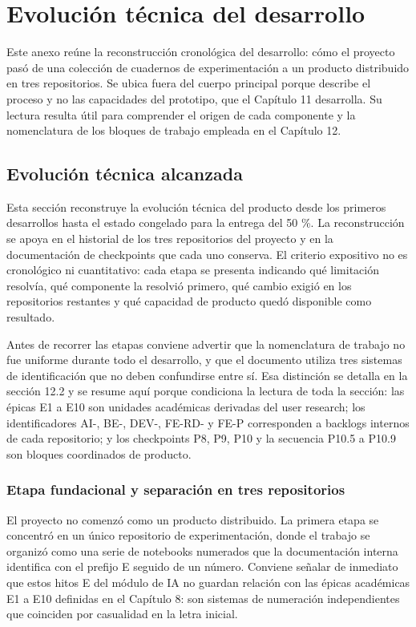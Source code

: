 \chapter{Evolución técnica del desarrollo}
\label{anexo:evolucion-tecnica}

Este anexo reúne la reconstrucción cronológica del desarrollo: cómo el proyecto pasó de una colección de cuadernos de experimentación a un producto distribuido en tres repositorios. Se ubica fuera del cuerpo principal porque describe el proceso y no las capacidades del prototipo, que el Capítulo 11 desarrolla. Su lectura resulta útil para comprender el origen de cada componente y la nomenclatura de los bloques de trabajo empleada en el Capítulo 12.

\section{Evolución técnica alcanzada}

Esta sección reconstruye la evolución técnica del producto desde los primeros desarrollos hasta el estado congelado para la entrega del 50 \%. La reconstrucción se apoya en el historial de los tres repositorios del proyecto y en la documentación de checkpoints que cada uno conserva. El criterio expositivo no es cronológico ni cuantitativo: cada etapa se presenta indicando qué limitación resolvía, qué componente la resolvió primero, qué cambio exigió en los repositorios restantes y qué capacidad de producto quedó disponible como resultado.

Antes de recorrer las etapas conviene advertir que la nomenclatura de trabajo no fue uniforme durante todo el desarrollo, y que el documento utiliza tres sistemas de identificación que no deben confundirse entre sí. Esa distinción se detalla en la sección 12.2 y se resume aquí porque condiciona la lectura de toda la sección: las épicas E1 a E10 son unidades académicas derivadas del user research; los identificadores AI-, BE-, DEV-, FE-RD- y FE-P corresponden a backlogs internos de cada repositorio; y los checkpoints P8, P9, P10 y la secuencia P10.5 a P10.9 son bloques coordinados de producto.

\subsection{Etapa fundacional y separación en tres repositorios}
\label{anexo:f-etapa-fundacional}

El proyecto no comenzó como un producto distribuido. La primera etapa se concentró en un único repositorio de experimentación, donde el trabajo se organizó como una serie de notebooks numerados que la documentación interna identifica con el prefijo E seguido de un número. Conviene señalar de inmediato que estos hitos E del módulo de IA no guardan relación con las épicas académicas E1 a E10 definidas en el Capítulo 8: son sistemas de numeración independientes que coinciden por casualidad en la letra inicial.

